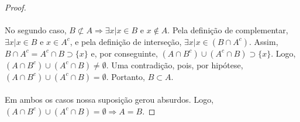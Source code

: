 \documentclass[11pt,a4paper]{report}
\begin{document}
\begin{proof}
    \paragraph{}
    No segundo caso, $B \not\subset A \Rightarrow \exists x | x \in B$ e $x \not\in A$. Pela definição de complementar, $\exists x | x \in B$ e $x \in A^c$, e pela definição de interseção, $\exists x | x \in (B \cap A^c)$. Assim, $B \cap A^c = A^c \cap B \supset \{x\}$ e, por conseguinte, $(A \cap B^c) \cup (A^c \cap B) \supset \{x\}$. Logo, $(A \cap B^c) \cup (A^c \cap B) \not= \emptyset$. Uma contradição, pois, por hipótese, $(A \cap B^c) \cup (A^c \cap B) = \emptyset$. Portanto, $B \subset A$.

    \paragraph{}
    Em ambos os casos nossa suposição gerou absurdos. Logo, $(A \cap B^c) \cup (A^c \cap B) = \emptyset \Rightarrow A = B$.
    \end{proof}
\end{document}
